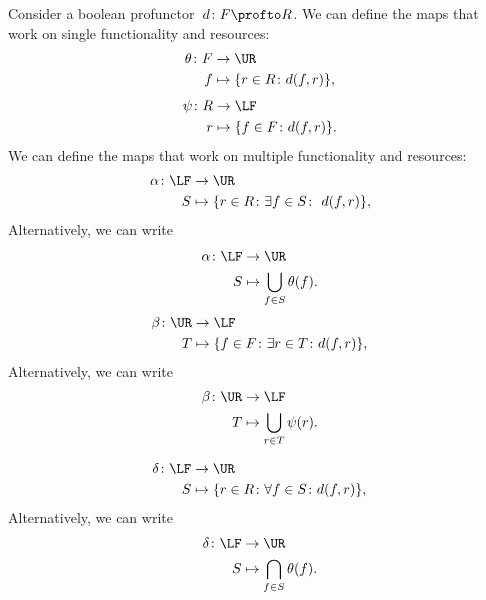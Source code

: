Consider a boolean profunctor~$d\colon F\profto R$. We can define the maps that work on single functionality and resources:
%
\begin{equation}
  \begin{aligned}
    \theta\colon F&\to \UR\\
    f&\mapsto \{r\in R \colon d(f, r) \},
  \end{aligned}
\end{equation}
%
\begin{equation}
  \begin{aligned}
    \psi\colon R&\to \LF\\
    r&\mapsto \{f\in F \colon d(f, r) \}.
  \end{aligned}
\end{equation}
We can define the maps that work on multiple functionality
and resources:
\begin{equation}
  \label{eq:galoisalfa}
  \begin{aligned}
    \alpha\colon \LF&\to \UR\\
    S&\mapsto \{r\in R \colon \exists f\in S\colon \ d(f,r)\},
  \end{aligned}
\end{equation}
Alternatively, we can write
\begin{equation}
  \begin{aligned}
    \alpha \colon \LF &\to \UR \\
    S&\mapsto \bigcup_{f\in S} \theta(f).
  \end{aligned}
\end{equation}
%
\begin{equation}
  \label{eq:galoisbeta}
  \begin{aligned}
    \beta\colon \UR&\to \LF\\
    T&\mapsto \{f\in F  \colon \exists r\in T\colon d(f,r)\},
  \end{aligned}
\end{equation}
%
\noindent Alternatively, we can write
\begin{equation}
  \begin{aligned}
    \beta \colon \UR &\to \LF \\
    T&\mapsto \bigcup_{r\in T} \psi(r).
  \end{aligned}
\end{equation}

\begin{equation}
  \label{eq:galoisdelta}
  \begin{aligned}
    \delta \colon \LF&\to \UR\\
    S&\mapsto \{r\in R \colon \forall {f\in S}\colon d(f,r)\},
  \end{aligned}
\end{equation}
Alternatively, we can write
\begin{equation}
  \begin{aligned}
    \delta\colon \LF &\to \UR\\
    S&\mapsto \bigcap_{f\in S}\theta(f).
  \end{aligned}
\end{equation}

